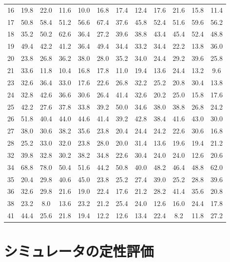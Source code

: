 \documentclass{ltjsreport}
\begin{document}
\begin{table}[H]
\begin{center}
\begin{tabular}{c|ccccccccccc}
			16 & 19.8 & 22.0 & 11.6 & 10.0 & 16.8 & 17.4 & 12.4 & 17.6 & 21.6 & 15.8 & 11.4 \\
			17 & 50.8 & 58.4 & 51.2 & 56.6 & 67.4 & 37.6 & 45.8 & 52.4 & 51.6 & 59.6 & 56.2 \\
			18 & 35.2 & 50.2 & 62.6 & 36.4 & 27.2 & 39.6 & 38.8 & 43.4 & 45.4 & 52.4 & 48.8 \\
			19 & 49.4 & 42.2 & 41.2 & 36.4 & 49.4 & 34.4 & 33.2 & 34.4 & 22.2 & 13.8 & 36.0 \\
			20 & 23.8 & 26.8 & 36.2 & 38.0 & 28.0 & 35.2 & 34.0 & 24.4 & 29.2 & 39.6 & 25.8 \\
			21 & 33.6 & 11.8 & 10.4 & 16.8 & 17.8 & 11.0 & 19.4 & 13.6 & 24.4 & 13.2 & 9.6 \\
			23 & 32.6 & 36.4 & 33.0 & 17.6 & 22.6 & 26.8 & 32.2 & 25.2 & 20.8 & 30.4 & 13.8 \\
			24 & 32.8 & 42.6 & 36.6 & 30.6 & 26.4 & 41.4 & 32.6 & 20.2 & 25.0 & 15.8 & 17.6 \\
			25 & 42.2 & 27.6 & 37.8 & 33.8 & 39.2 & 50.0 & 34.6 & 38.0 & 38.8 & 26.8 & 24.2 \\
			26 & 51.8 & 40.4 & 44.0 & 44.6 & 41.4 & 39.2 & 42.8 & 38.4 & 41.6 & 43.0 & 30.0 \\
			27 & 38.0 & 30.6 & 38.2 & 35.6 & 23.8 & 20.4 & 24.4 & 24.2 & 22.6 & 30.6 & 16.8 \\
			28 & 25.2 & 33.0 & 32.0 & 23.8 & 28.0 & 20.0 & 31.4 & 13.6 & 19.6 & 19.4 & 21.2 \\
			32 & 39.8 & 32.8 & 30.2 & 38.2 & 34.8 & 22.6 & 30.4 & 24.0 & 24.0 & 12.6 & 20.6 \\
			34 & 68.8 & 78.0 & 50.4 & 51.6 & 44.2 & 50.8 & 40.0 & 48.2 & 46.4 & 48.8 & 62.0 \\
			35 & 20.4 & 29.8 & 40.6 & 45.0 & 23.8 & 25.2 & 27.4 & 39.0 & 25.2 & 28.8 & 39.6 \\
			36 & 32.6 & 29.8 & 21.6 & 19.0 & 22.4 & 17.6 & 21.2 & 28.2 & 41.4 & 35.6 & 20.8 \\
			38 & 23.2 & 8.0 & 13.6 & 23.2 & 21.2 & 25.4 & 24.0 & 12.6 & 16.0 & 24.4 & 17.8 \\
			41 & 44.4 & 25.6 & 21.8 & 19.4 & 12.2 & 12.6 & 13.4 & 22.4 & 8.2 & 11.8 & 27.2 \\
			\bottomrule
		\end{tabular}
		\end{center}
		\end{table}
	\section{シミュレータの定性評価}
\end{document}
